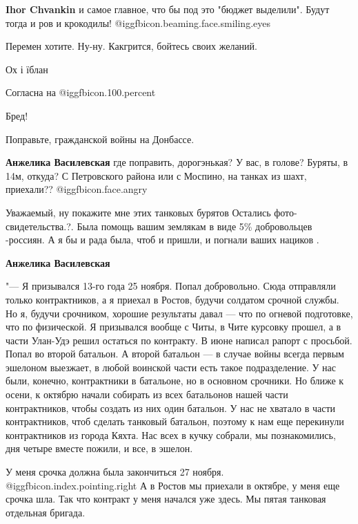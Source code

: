 \begin{itemize}
\begin{itemize}
\textbf{Ihor Chvankin} и самое главное, что бы под это "бюджет выделили". Будут тогда и ров и крокодилы!  @igg{fbicon.beaming.face.smiling.eyes} 

\end{itemize} %

Перемен хотите. Ну-ну. Какгрится, бойтесь своих желаний.

Ох і їблан

Согласна на  @igg{fbicon.100.percent} 

Бред!

Поправьте, гражданской войны на Донбассе.

\begin{itemize} %
\textbf{Анжелика Василевская} где поправить, дорогэнькая? У вас, в голове? Буряты, в 14м, откуда? С Петровского района или с Моспино, на танках из шахт, приехали??  @igg{fbicon.face.angry} 


Уважаемый, ну покажите мне этих танковых бурятов Остались фото-свидетельства.?.
Была помощь вашим землякам в виде 5\% добровольцев -россиян. А я бы и рада была,
чтоб и пришли, и погнали ваших нациков .


\textbf{Анжелика Василевская} 

"— Я призывался 13-го года 25 ноября. Попал добровольно. Сюда отправляли только
контрактников, а я приехал в Ростов, будучи солдатом срочной службы. Но я,
будучи срочником, хорошие результаты давал — что по огневой подготовке, что по
физической. Я призывался вообще с Читы, в Чите курсовку прошел, а в части
Улан-Удэ решил остаться по контракту. В июне написал рапорт с просьбой. Попал
во второй батальон. А второй батальон — в случае войны всегда первым эшелоном
выезжает, в любой воинской части есть такое подразделение. У нас были, конечно,
контрактники в батальоне, но в основном срочники. Но ближе к осени, к октябрю
начали собирать из всех батальонов нашей части контрактников, чтобы создать из
них один батальон. У нас не хватало в части контрактников, чтоб сделать
танковый батальон, поэтому к нам еще перекинули контрактников из города Кяхта.
Нас всех в кучку собрали, мы познакомились, дня четыре вместе пожили, и все, в
эшелон.

У меня срочка должна была закончиться 27 ноября.  @igg{fbicon.index.pointing.right} А в Ростов мы приехали в
октябре, у меня еще срочка шла. Так что контракт у меня начался уже здесь. Мы
пятая танковая отдельная бригада.


\end{itemize}
\end{itemize}
